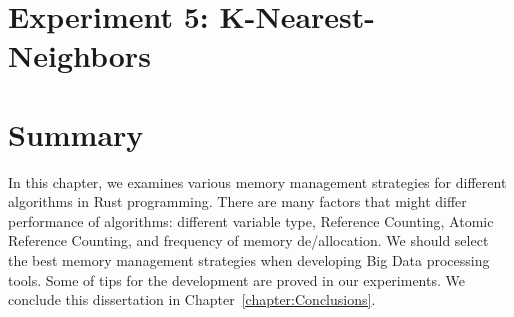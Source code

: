 \section{Experiment 5: K-Nearest-Neighbors}
\label{sec:eval_knn}


\section{Summary}
\label{sec:eval_summary}
In this chapter, we examines various memory management strategies for different algorithms in Rust programming.
There are many factors that might differ performance of algorithms: different variable type, Reference Counting, Atomic Reference Counting, and frequency of memory de/allocation.
We should select the best memory management strategies when developing Big Data processing tools. 
Some of tips for the development are proved in our experiments. We conclude this dissertation in Chapter~\ref{chapter:Conclusions}.

% 